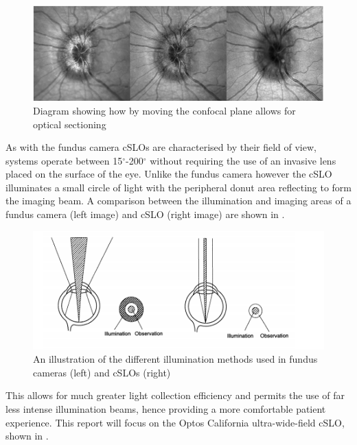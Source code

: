 \begin{figure}[htbp]
\centering
\includegraphics{figures/confocalimages}
\caption{Diagram showing how by moving the confocal plane allows for optical sectioning}
\label{fig:3dconfocal}
\end{figure}

As with the fundus camera cSLOs are characterised by their field of view,
systems operate between 15$^\circ$-200$^\circ$ without requiring the use of
an invasive lens placed on the surface of the eye. Unlike the fundus camera
however the cSLO illuminates a small circle of light with the peripheral donut
area reflecting to form the imaging beam. A comparison between the illumination
and imaging areas of a fundus camera (left image) and cSLO (right image) are
shown in  .


\begin{figure}[htbp]
\centering
\includegraphics{figures/illumination}
\caption{An illustration of the different illumination methods used in fundus cameras (left) and cSLOs (right)}
\label{fig:illum}
   \end{figure}


This allows for much greater light collection efficiency and permits the use
of far less intense illumination beams, hence providing a more comfortable
patient experience.\cite{5_bennett_2015} This report will focus on the Optos
California ultra-wide-field cSLO, shown in .

